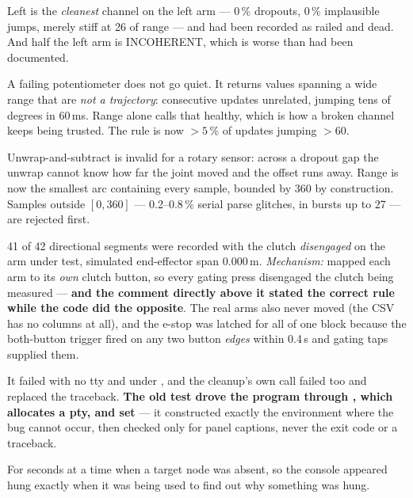 {Left  is the \emph{cleanest} channel on the left arm --- 0\,\%
dropouts, 0\,\% implausible jumps, merely stiff at 26\dg{} of range --- and had
been recorded as railed and dead. And half the left arm is INCOHERENT, which is
worse than had been documented.}

{A failing potentiometer does not go quiet. It returns values spanning a wide
range that are \emph{not a trajectory}: consecutive updates unrelated, jumping
tens of degrees in 60\,ms. Range alone calls that healthy, which is how a
broken channel keeps being trusted. The rule is now $>5$\,\% of updates jumping
$>60$\dg.}

{Unwrap-and-subtract is invalid for a rotary sensor: across a dropout gap the
unwrap cannot know how far the joint moved and the offset runs away. Range is
now the smallest arc containing every sample, bounded by 360 by construction.
Samples outside $[0,360]$ --- 0.2--0.8\,\% serial parse glitches, in bursts up
to 27 --- are rejected first.}

{41 of 42 directional segments were recorded with the clutch \emph{disengaged}
on the arm under test, simulated end-effector span 0.000\,m.
\textit{Mechanism:}  mapped each arm to its \emph{own} clutch
button, so every gating press disengaged the clutch being measured ---
\textbf{and the comment directly above it stated the correct rule while the code
did the opposite}. The real arms also never moved (the CSV has no
 columns at all), and the e-stop was latched for all of one block
because the both-button trigger fired on any two button \emph{edges} within
0.4\,s and gating taps supplied them.}

{It failed with no tty and under , and the cleanup's own call
failed too and replaced the traceback. \textbf{The old test drove the program
through , which allocates a pty, and set
} --- it constructed exactly the environment where the bug
cannot occur, then checked only for panel captions, never the exit code or a
traceback.}

{For seconds at a time when a target node was absent, so the console appeared
hung exactly when it was being used to find out why something was hung.}

